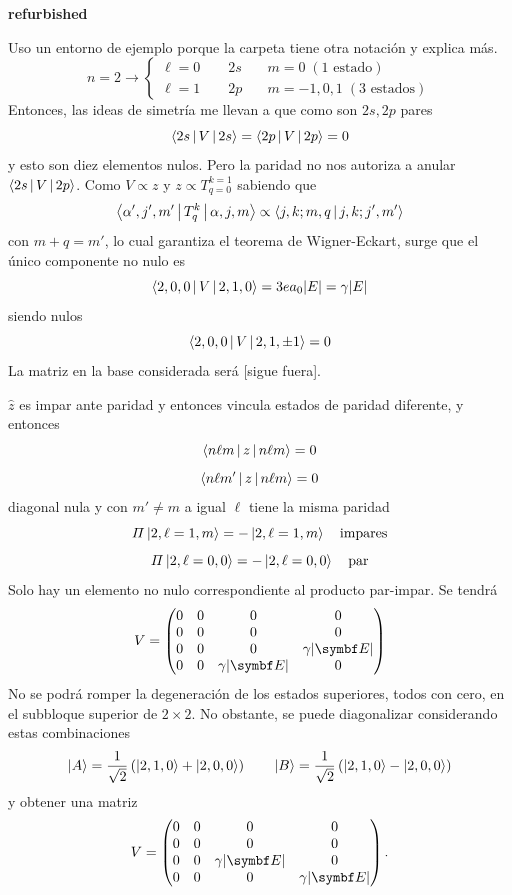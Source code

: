 \documentclass[10pt,oneside]{CBFT_book}
\begin{document}
\begin{ejemplo}{\bf refurbished}

Uso un entorno de ejemplo porque la carpeta tiene otra notación y explica más.
\[
	n=2 \to \begin{cases}
	 \ell=0 \qquad 2s \quad & m=0 \; ( 1 \text{ estado}) \\
	 \ell=1 \qquad 2p \quad & m=-1,0,1 \; ( 3 \text{ estados}) 
	\end{cases}
\]
Entonces, las ideas de simetría me llevan a que como son $2s, 2p$ pares
\[
	\Braket{2s|V|2s} = \Braket{2p|V|2p} = 0
\]
y esto son diez elementos nulos. Pero la paridad no nos autoriza a anular $\Braket{2s|V|2p}$.
Como $V \propto z$ y $z \propto T_{q=0}^{k=1}$ sabiendo que
\[
	\Braket{\alpha',j',m'|T_{q}^{k}|\alpha, j, m} \propto 
	\Braket{j,k;m,q|j,k;j',m'}
\]
con $m+q=m'$,
lo cual garantiza el teorema de Wigner-Eckart, surge que el único componente no nulo es
\[
	\Braket{2,0,0|V|2,1,0} = 3 e a_0 |E| = \gamma |E|
\]
siendo nulos
\[
	\Braket{2,0,0|V|2,1,\pm 1} = 0
\]
La matriz en la base considerada será [sigue fuera].
 
\end{ejemplo}


$\hat{z}$ es impar ante paridad y entonces vincula estados de paridad diferente,
y entonces 
\[
	\Braket{n\ell m|z|n\ell m} = 0 
\]
\[
	\Braket{n\ell m'|z|n\ell m} = 0 
\]
diagonal nula y con $m'\neq m$ a igual $\ell$ tiene la misma paridad
\[
	\Pi \Ket{2,\ell=1,m} = -\Ket{2,\ell=1,m} \quad \text{impares}
\]
\[
	\Pi \Ket{2,\ell=0,0} = -\Ket{2,\ell=0,0} \quad \text{par}
\]
Solo hay un elemento no nulo correspondiente al producto par-impar.
Se tendrá 
\[
	V = \begin{pmatrix}
	   0 & 0 & 0 & 0 \\
	   0 & 0 & 0 & 0 \\
	   0 & 0 & 0 & \gamma|\vb{E}| \\
	   0 & 0 & \gamma|\vb{E}| & 0
	  \end{pmatrix}
\]
No se podrá romper la degeneración de los estados superiores, todos con cero,
en el subbloque superior de $2\times 2$.
No obstante, se puede diagonalizar considerando estas combinaciones
\[
	\Ket{A} = \frac{1}{\sqrt{2}} \left( \Ket{2,1,0} + \Ket{2,0,0} \right)
	\qquad
	\Ket{B} = \frac{1}{\sqrt{2}} \left( \Ket{2,1,0} - \Ket{2,0,0} \right)
\]
y obtener una matriz
\[
	V = \begin{pmatrix}
	   0 & 0 & 0 & 0 \\
	   0 & 0 & 0 & 0 \\
	   0 & 0 & \gamma|\vb{E}| & 0 \\	   
	   0 & 0 & 0 & \gamma|\vb{E}| 
	  \end{pmatrix}.
\]
\end{document}
